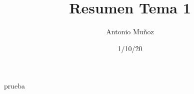 \documentclass{article}
\title{Resumen Tema 1}
\author{Antonio Muñoz}
\date{1/10/20}
\begin{document}
\maketitle	
prueba
\end{document}
